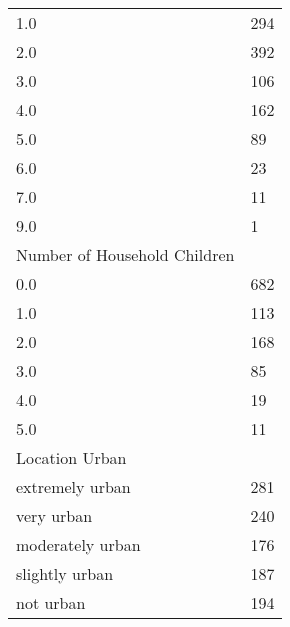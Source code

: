 \documentclass{article}
\begin{document}
\begin{table}[h]
\begin{tabular}{ll}
1.0                                                                             & 294    \\
2.0                                                                             & 392    \\
3.0                                                                             & 106    \\
4.0                                                                             & 162    \\
5.0                                                                             & 89     \\
6.0                                                                             & 23     \\
7.0                                                                             & 11     \\
9.0                                                                             & 1      \\ \hline
Number of Household Children                                                    &        \\
0.0                                                                             & 682    \\
1.0                                                                             & 113    \\
2.0                                                                             & 168    \\
3.0                                                                             & 85     \\
4.0                                                                             & 19     \\
5.0                                                                             & 11     \\ \hline
Location Urban                                                                  &        \\
extremely urban                                                                 & 281    \\
very urban                                                                      & 240    \\
moderately urban                                                                & 176    \\
slightly urban                                                                  & 187    \\
not urban                                                                       & 194    \\ \hline
\end{tabular}
\end{table}
\end{document}
